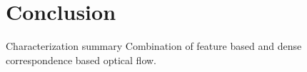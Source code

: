\chapter{Conclusion}

Characterization summary
Combination of feature based and dense correspondence based optical flow. 
